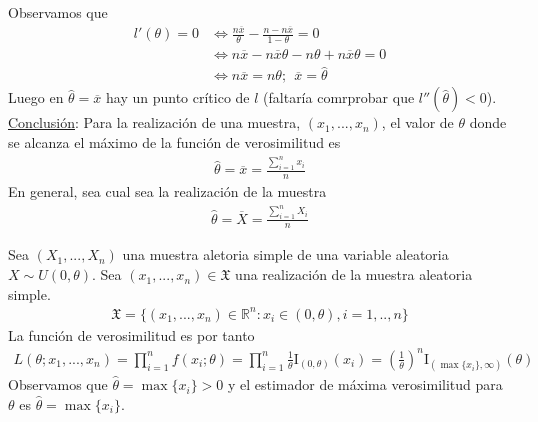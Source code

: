 \begin{ejemplo}
\begin{align*}
\end{align*}
Observamos que
\begin{align*}
    l'(\theta) = 0 &\Longleftrightarrow \frac{n\overline{x}}{\theta} - \frac{n - n\overline{x}}{1 - \theta} = 0 \\
    &\Longleftrightarrow n\overline{x} - n\overline{x}\theta - n\theta + n\overline{x}\theta = 0 \\
    &\Longleftrightarrow n\overline{x} = n\theta; \ \ \overline{x} = \hat{\theta}
\end{align*}
Luego en $\hat{\theta} = \overline{x}$ hay un punto crítico de $l$ (faltaría comrprobar que $l''(\hat{\theta}) < 0$).
\\
\newline
\underline{Conclusión}: Para la realización de una muestra, $(x_1,...,x_n)$, el valor de $\theta$ donde se alcanza el máximo de la función de verosimilitud es
\begin{align*}
    \hat{\theta} = \overline{x} = \frac{\sum_{i=1}^{n}{x_i}}{n}
\end{align*}
En general, sea cual sea la realización de la muestra
\begin{align*}
    \hat{\theta} = \overline{X} = \frac{\sum_{i=1}^{n}{X_i}}{n}
\end{align*}
\end{ejemplo}

\begin{ejemplo}
Sea $(X_1,...,X_n)$ una muestra aletoria simple de una variable aleatoria $X \sim U(0,\theta)$. Sea $(x_1,...,x_n) \in \mathfrak{X}$ una realización de la muestra aleatoria simple.
\begin{align*}
    \mathfrak{X} = \{ (x_1,...,x_n) \in \mathbb{R}^n : x_i \in (0,\theta), i = 1,..,n \}
\end{align*}
La función de verosimilitud es por tanto
\begin{align*}
    L(\theta;x_1,...,x_n) = \prod_{i=1}^{n}{f(x_i;\theta)} = \prod_{i=1}^{n}{\frac{1}{\theta}\text{I}_{(0,\theta)}(x_i)} = \left( \frac{1}{\theta} \right)^{n} \text{I}_{(\max\{x_i\}, \infty)}(\theta)
\end{align*}
Observamos que $\hat{\theta} = \max\{x_i\} > 0$ y el estimador de máxima verosimilitud para $\theta$ es $\hat{\theta} = \max\{x_i\}$.
\end{ejemplo}

